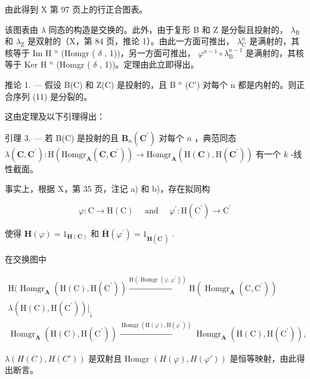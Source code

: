 由此得到 X 第 97 页上的行正合图表。

该图表由 \(\lambda\) 同态的构造是交换的。此外，由于复形 B 和 Z 是分裂且投射的， \(\lambda_{\mathrm{B}}\) 和 \(\lambda_{\mathrm{Z}}\) 是双射的（X，第 84 页，推论 1）。由此一方面可推出， \(\lambda_{\mathrm{C}}^{n}\) 是满射的，其核等于 Im H \(^{n}\) (Homgr ( \(\delta\) , 1))，另一方面可推出， \(\varphi^{n-1} \circ \lambda_{\mathrm{B}}^{n-1}\) 是满射的，其核等于 Ker H \(^{n}\) (Homgr ( \(\delta\) , 1))。定理由此立即得出。

推论 1. --- 假设 B(C) 和 Z(C) 是投射的，且 B \(^{n}\) (C') 对每个 n 都是内射的。则正合序列 (11) 是分裂的。

这由定理及以下引理得出：

引理 3. --- 若 B(C) 是投射的且 \(\mathbf{B}_{n}(\mathbf{C}^{\prime})\) 对每个 \(n\) ，典范同态 \(\lambda(\mathbf{C}, \mathbf{C}^{\prime}): \mathrm{H}(\mathrm{Homgr}_{\mathbf{A}}(\mathbf{C}, \mathbf{C}^{\prime})) \to \mathrm{Homgr}_{\mathbf{A}}(\mathrm{H}(\mathbf{C}), \mathrm{H}(\mathbf{C}^{\prime}))\) 有一个 \(k\) -线性截面。

事实上，根据 X，第 35 页，注记 a) 和 b)，存在拟同构

\[
\varphi : \mathrm{C} \rightarrow \mathrm{H} (\mathrm{C}) \quad \text { and } \quad \varphi^ {\prime}: \mathrm{H} (\mathrm{C} ^ {\prime}) \rightarrow \mathrm{C} ^ {\prime}
\]

使得 \(\mathbf{H}(\varphi) = 1_{\mathbf{H}(\mathbf{C})}\) 和 \(\bar{\mathbf{H}} (\varphi^{\prime}) = 1_{\mathbf{H}(\mathbf{C}^{\prime})}\) .

在交换图中

\[
\begin{array}{l} \mathrm{H} (\operatorname{Homgr} _ {\mathbf {A}} (\mathrm{H} (\mathrm{C}), \mathrm{H} (\mathrm{C} ^ {\prime})) \xrightarrow {\mathrm{H} (\operatorname{Homgr} (\varphi , \varphi^ {\prime}))} \mathrm{H} (\operatorname{Homgr} _ {\mathbf {A}} (\mathrm{C}, \mathrm{C} ^ {\prime})) \\ \lambda (\mathrm{H} (\mathrm{C}), \mathrm{H} (\mathrm{C} ^ {\prime})) \Big | _ {\downarrow} \\ \operatorname{Homgr} _ {\mathbf {A}} (\mathrm{H} (\mathrm{C}), \mathrm{H} (\mathrm{C} ^ {\prime})) \xrightarrow {\operatorname{Homgr} (\mathrm{H} (\varphi) , \mathrm{H} (\varphi^ {\prime}))} \operatorname{Homgr} _ {\mathbf {A}} (\mathrm{H} (\mathrm{C}), \mathrm{H} (\mathrm{C} ^ {\prime}))  , \end{array}
\]

\(\lambda(H(C), H(C'))\) 是双射且 Homgr \((H(\varphi), H(\varphi'))\) 是恒等映射，由此得出断言。

